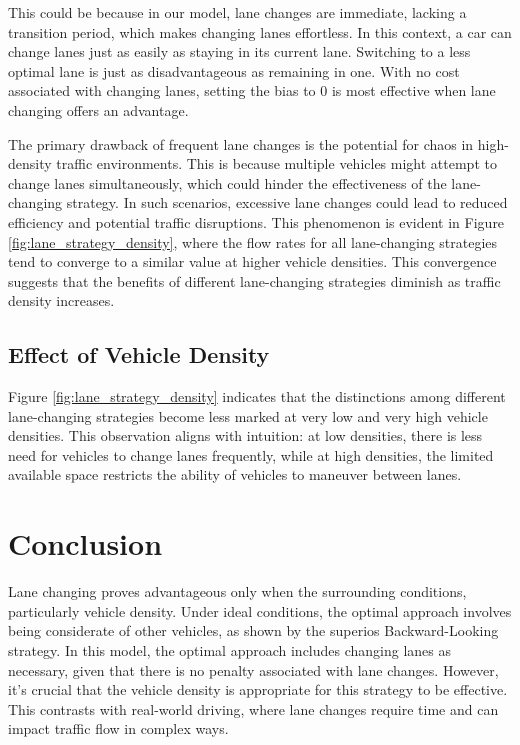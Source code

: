 \documentclass{article}
\begin{document}
This could be because in our model, lane changes are immediate, lacking a transition period, which makes changing lanes effortless. In this context, a car can change lanes just as easily as staying in its current lane. Switching to a less optimal lane is just as disadvantageous as remaining in one. With no cost associated with changing lanes, setting the bias to 0 is most effective when lane changing offers an advantage.

The primary drawback of frequent lane changes is the potential for chaos in high-density traffic environments. This is because multiple vehicles might attempt to change lanes simultaneously, which could hinder the effectiveness of the lane-changing strategy. In such scenarios, excessive lane changes could lead to reduced efficiency and potential traffic disruptions. This phenomenon is evident in Figure \ref{fig:lane_strategy_density}, where the flow rates for all lane-changing strategies tend to converge to a similar value at higher vehicle densities. This convergence suggests that the benefits of different lane-changing strategies diminish as traffic density increases.

\subsection{Effect of Vehicle Density}
Figure \ref{fig:lane_strategy_density} indicates that the distinctions among different lane-changing strategies become less marked at very low and very high vehicle densities. This observation aligns with intuition: at low densities, there is less need for vehicles to change lanes frequently, while at high densities, the limited available space restricts the ability of vehicles to maneuver between lanes.

\newpage
\section{Conclusion}
Lane changing proves advantageous only when the surrounding conditions, particularly vehicle density. Under ideal conditions, the optimal approach involves being considerate of other vehicles, as shown by the superios Backward-Looking strategy. In this model, the optimal approach includes changing lanes as necessary, given that there is no penalty associated with lane changes. However, it's crucial that the vehicle density is appropriate for this strategy to be effective. This contrasts with real-world driving, where lane changes require time and can impact traffic flow in complex ways.
\end{document}
